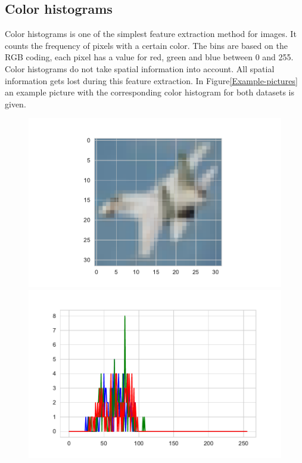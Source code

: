 \documentclass[11pt]{article}
\begin{document}
\subsection{Color histograms}
Color histograms is one of the simplest feature extraction method for images. It counts the frequency of pixels with a certain color. The bins are based on the RGB coding, each pixel has a value for red, green and blue between 0 and 255. Color histograms do not take spatial information into account. All spatial information gets lost during this feature extraction. In Figure\ref{Example-pictures} an example picture with the corresponding color histogram for both datasets is given.\\
%
\begin{figure}[H]
\begin{minipage}[c]{0.4\textwidth}
\includegraphics[width=1\linewidth]{figures/Example_picture_Cifar.pdf}
\end{minipage}
\begin{minipage}[d]{0.6\textwidth}
\includegraphics[width=1\linewidth]{figures/Example_picture_Cifar_hist.pdf}

\end{minipage}
\end{figure}
\end{document}
